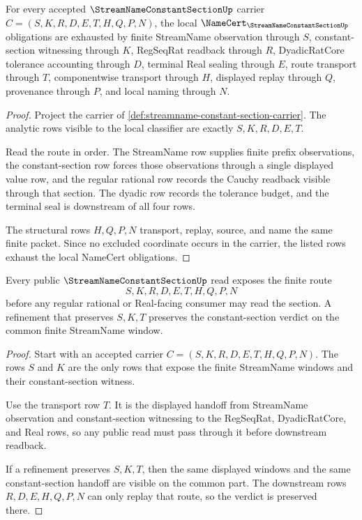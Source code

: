 \begin{theorem}
\label{thm:streamname-constant-section-namecert-obligations}
For every accepted $\StreamNameConstantSectionUp$ carrier $C=(S,K,R,D,E,T,H,Q,P,N)$, the local $\NameCert_{\StreamNameConstantSectionUp}$ obligations are exhausted by finite StreamName observation through $S$, constant-section witnessing through $K$, RegSeqRat readback through $R$, DyadicRatCore tolerance accounting through $D$, terminal Real sealing through $E$, route transport through $T$, componentwise transport through $H$, displayed replay through $Q$, provenance through $P$, and local naming through $N$.
\end{theorem}
\begin{proof}
Project the carrier of \autoref{def:streamname-constant-section-carrier}. The analytic rows visible to the local classifier are exactly $S,K,R,D,E,T$.

Read the route in order. The StreamName row supplies finite prefix observations, the constant-section row forces those observations through a single displayed value row, and the regular rational row records the Cauchy readback visible through that section. The dyadic row records the tolerance budget, and the terminal seal is downstream of all four rows.

The structural rows $H,Q,P,N$ transport, replay, source, and name the same finite packet. Since no excluded coordinate occurs in the carrier, the listed rows exhaust the local NameCert obligations.
\end{proof}

\begin{theorem}
\label{thm:streamname-constant-section-streamname-route}
Every public $\StreamNameConstantSectionUp$ read exposes the finite route
$$
S,K,R,D,E,T,H,Q,P,N
$$
before any regular rational or Real-facing consumer may read the section. A refinement that preserves $S,K,T$ preserves the constant-section verdict on the common finite StreamName window.
\end{theorem}
\begin{proof}
Start with an accepted carrier $C=(S,K,R,D,E,T,H,Q,P,N)$. The rows $S$ and $K$ are the only rows that expose the finite StreamName windows and their constant-section witness.

Use the transport row $T$. It is the displayed handoff from StreamName observation and constant-section witnessing to the RegSeqRat, DyadicRatCore, and Real rows, so any public read must pass through it before downstream readback.

If a refinement preserves $S,K,T$, then the same displayed windows and the same constant-section handoff are visible on the common part. The downstream rows $R,D,E,H,Q,P,N$ can only replay that route, so the verdict is preserved there.
\end{proof}

